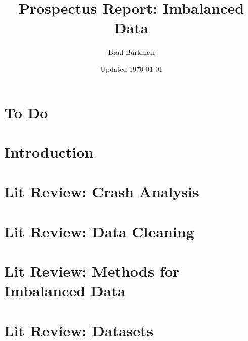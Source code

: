 \documentclass[11pt]{report}
\title{Prospectus Report:  Imbalanced Data}
\author{Brad Burkman}
\date{Updated \today}
\begin{document}
\setlength{\parindent}{20pt}
\begin{spacing}{1.2}
\setcounter{chapter}{-1}


\maketitle
\tableofcontents


\newpage
{}
{}
\printindex


\chapter{To Do}


\chapter{Introduction}



\chapter{Lit Review:  Crash Analysis}




\chapter{Lit Review:  Data Cleaning}



\chapter{Lit Review: Methods for Imbalanced Data}













\chapter{Lit Review:  Datasets}


\end{spacing}
\end{document}
